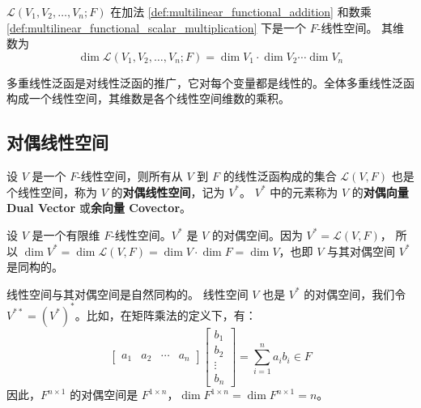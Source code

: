 \begin{proposition}[全体多重线性泛函构成一个线性空间]
    $\mathcal{L}(V_1,V_2,\ldots,V_n;F)$ 在加法 \ref{def:multilinear_functional_addition} 和数乘 \ref{def:multilinear_functional_scalar_multiplication} 下是一个 $F$-线性空间。
    其维数为
    \[
        \dim \mathcal{L}(V_1,V_2,\ldots,V_n;F) = \dim V_1 \cdot \dim V_2 \cdots \dim V_n
    \]
\end{proposition}

\begin{note}
    多重线性泛函是对线性泛函的推广，它对每个变量都是线性的。全体多重线性泛函构成一个线性空间，其维数是各个线性空间维数的乘积。
\end{note}


\vspace{1em}
\subsection{对偶线性空间}

\begin{definition}
    设 $V$ 是一个 $F$-线性空间，则所有从 $V$ 到 $F$ 的线性泛函构成的集合 $\mathcal{L}(V,F)$ 也是个线性空间，称为 $V$ 的\textbf{对偶线性空间}，记为 $V^*$。
    $V^*$ 中的元素称为 $V$ 的\textbf{对偶向量 Dual Vector} 或\textbf{余向量 Covector}。 
    \label{def:dual_linear_space}
\end{definition}

\begin{proposition}[线性空间与其对偶空间是自然同构的]
    设 $V$ 是一个有限维 $F$-线性空间。$V^*$ 是 $V$ 的对偶空间。因为 $V^* = \mathcal{L}(V,F)$，
    所以 $\dim V^* = \dim \mathcal{L}(V,F) = \dim V \cdot \dim F = \dim V$，也即 $V$ 与其对偶空间 $V^*$ 是同构的。
\end{proposition}

\begin{note}
    线性空间与其对偶空间是自然同构的。
    线性空间 $V$ 也是 $V^*$ 的对偶空间，我们令 $V^{**} = (V^*)^*$。比如，在矩阵乘法的定义下，有：
    \[
        \begin{bmatrix}
            a_1 & a_2 & \cdots & a_n
        \end{bmatrix}\begin{bmatrix}
            b_1 \\ b_2 \\ \vdots \\ b_n
        \end{bmatrix} = \sum_{i=1}^{n} a_i b_i \in F
    \]
    因此，$F^{n\times 1}$ 的对偶空间是 $F^{1\times n}$，$\dim F^{1\times n} = \dim F^{n\times 1} = n$。
\end{note}
\vspace{1em}

